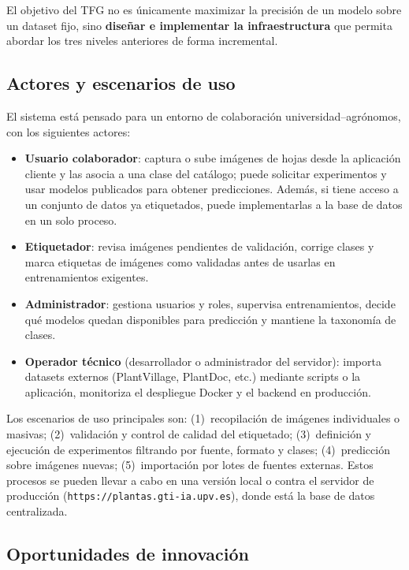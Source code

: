 \documentclass[11pt,spanish,listoffigures,listoftables]{tfgetsinf}
\begin{document}
El objetivo del TFG no es únicamente maximizar la precisión de un modelo sobre un dataset fijo, sino \textbf{diseñar e implementar la infraestructura} que permita abordar los tres niveles anteriores de forma incremental.

\subsection{Actores y escenarios de uso}

El sistema está pensado para un entorno de colaboración universidad--agrónomos, con los siguientes actores:

\begin{itemize}
    \item \textbf{Usuario colaborador}: captura o sube imágenes de hojas desde la aplicación cliente y las asocia a una clase del catálogo; puede solicitar experimentos y usar modelos publicados para obtener predicciones. Además, si tiene acceso a un conjunto de datos ya etiquetados, puede implementarlas a la base de datos en un solo proceso.
    \item \textbf{Etiquetador}: revisa imágenes pendientes de validación, corrige clases y marca etiquetas de imágenes como validadas antes de usarlas en entrenamientos exigentes.
    \item \textbf{Administrador}: gestiona usuarios y roles, supervisa entrenamientos, decide qué modelos quedan disponibles para predicción y mantiene la taxonomía de clases.
    \item \textbf{Operador técnico} (desarrollador o administrador del servidor): importa datasets externos (PlantVillage, PlantDoc, etc.) mediante scripts o la aplicación, monitoriza el despliegue Docker y el backend en producción.
\end{itemize}

Los escenarios de uso principales son: (1)~recopilación de imágenes individuales o masivas; (2)~validación y control de calidad del etiquetado; (3)~definición y ejecución de experimentos filtrando por fuente, formato y clases; (4)~predicción sobre imágenes nuevas; (5)~importación por lotes de fuentes externas. Estos procesos se pueden llevar a cabo en una versión local o contra el servidor de producción (\texttt{https://plantas.gti-ia.upv.es}), donde está la base de datos centralizada.

\subsection{Oportunidades de innovación}
\end{document}
